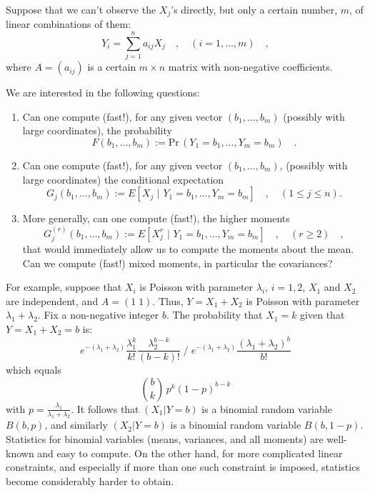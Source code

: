 \documentclass[11pt]{article}
\newcommand{\Prob}{\mbox{Pr}\,}
\begin{document}
Suppose that we can't observe the $X_j$'s directly, 
but only a certain number, $m$, of linear combinations
of them:
\[
Y_i=\sum_{j=1}^{n} a_{ij} X_j \quad , \quad (i=1 , \ldots  , m )\quad ,
\]
where $A=(a_{ij})$ is a certain $m \times n$ matrix with 
non-negative coefficients.

We are interested in the following questions:

\begin{enumerate}
\item
Can one compute (fast!{}), for any given vector $(b_1, \ldots , b_m)$ 
(possibly with large coordinates), the
probability
\[
F(b_1, \ldots , b_m):= \Prob(Y_1=b_1, \ldots , Y_m=b_m) \quad .
\]
\item
Can one compute (fast!{}), for any given vector $(b_1, \ldots , b_m)$, 
(possibly with large coordinates) the
conditional expectation
\[
G_j(b_1, \ldots , b_m):= 
E[X_j \,\, \bigl \vert \, \, Y_1=b_1, \ldots  , Y_m=b_m] \quad , \quad 
(1 \leq j \leq n) .
\]
\item
More generally, can one compute (fast!{}), 
the higher moments
\[
G_j^{(r)} (b_1, \ldots , b_m):= 
E[X_j^r \,\, \bigl \vert \,\, Y_1=b_1, \ldots  , Y_m=b_m]
\quad , \quad (r \geq 2) \quad ,
\]
that would immediately allow us to compute the moments about the mean.
Can we compute (fast!{}) mixed moments, in particular the covariances?
\end{enumerate}

For example, suppose that $X_i$ is Poisson with parameter $\lambda _i$, $i=1,2$,
$X_1$ and $X_2$ are independent, and $A=(1 \; 1)$.
Thus, $Y=X_1+X_2$ is Poisson with parameter $\lambda _1+\lambda _2$.
Fix a non-negative integer $b$.
The probability that $X_1=k$ given that $Y=X_1+X_2=b$
is:
\[
e^{-(\lambda _1+\lambda _2)} \frac{\lambda _1^k}{k!}\frac{\lambda _2^{b-k}}{(b-k)!}
\;{\Bigg/} \;
e^{-(\lambda _1+\lambda _2)} \frac{(\lambda _1+\lambda _2)^b}{b!}
\]
which equals
\[
{b \choose k} \,p^k(1-p)^{b-k}
\]
with $p = \frac{\lambda _1}{\lambda _1+\lambda _2}$.
It follows that
$(X_1|Y=b)$ is a binomial random variable $B(b,p)$, and similarly $(X_2|Y=b)$
is a binomial random variable $B(b,1-p)$.
Statistics for binomial variables (means, variances, and all moments) are
well-known and easy to compute.  On the other hand, for more complicated
linear constraints, and especially if more than one such constraint is
imposed, statistics become considerably harder to obtain.
\end{document}
